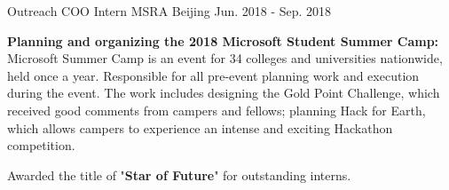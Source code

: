 

\begin{cventries}

  \cventry
    {Outreach COO Intern} %
    {MSRA} %
    {Beijing} %
    {Jun. 2018 - Sep. 2018} %
    {
      \begin{cvitems} %
        \item {\textbf{Planning and organizing the 2018 Microsoft Student Summer Camp:}
        Microsoft Summer Camp is an event for 34 colleges and universities nationwide, held once a year. Responsible for all pre-event planning work and execution during the event.
        The work includes designing the Gold Point Challenge, which received good comments from campers and fellows; planning Hack for Earth, which allows campers to experience an intense and exciting Hackathon competition.}
        \item {Awarded the title of "\textbf{Star of Future}" for outstanding interns.}
      \end{cvitems}
    }

\end{cventries}
